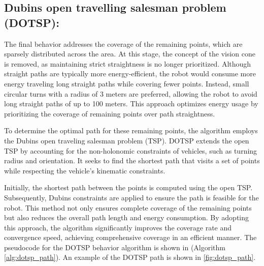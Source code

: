 \subsection{Dubins open travelling salesman problem (DOTSP):}



The final behavior addresses the coverage of the remaining points, which are sparsely distributed across the area. At this stage, the concept of the vision cone is removed, as maintaining strict straightness is no longer prioritized. Although straight paths are typically more energy-efficient, the robot would consume more energy traveling long straight paths while covering fewer points. Instead, small circular turns with a radius of 3 meters are preferred, allowing the robot to avoid long straight paths of up to 100 meters. This approach optimizes energy usage by prioritizing the coverage of remaining points over path straightness.

\vspace{3mm}   

To determine the optimal path for these remaining points, the algorithm employs the Dubins open traveling salesman problem (TSP). DOTSP extends the open TSP by accounting for the non-holonomic constraints of vehicles, such as turning radius and orientation. It seeks to find the shortest path that visits a set of points while respecting the vehicle's kinematic constraints. 

\vspace{3mm}   

Initially, the shortest path between the points is computed using the open TSP. Subsequently, Dubins constraints are applied to ensure the path is feasible for the robot. This method not only ensures complete coverage of the remaining points but also reduces the overall path length and energy consumption. By adopting this approach, the algorithm significantly improves the coverage rate and convergence speed, achieving comprehensive coverage in an efficient manner. The pseudocode for the DOTSP behavior algorithm is shown in (Algorithm \autoref{alg:dotsp_path}). An example of the DOTSP path is shown in \autoref{fig:dotsp_path}.


